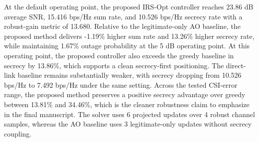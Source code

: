 At the default operating point, the proposed IRS-Opt controller reaches 23.86 dB average SNR, 15.416 bps/Hz sum rate, and 10.526 bps/Hz secrecy rate with a robust-gain metric of 13.680. Relative to the legitimate-only AO baseline, the proposed method delivers -1.19\% higher sum rate and 13.26\% higher secrecy rate, while maintaining 1.67\% outage probability at the 5 dB operating point. At this operating point, the proposed controller also exceeds the greedy baseline in secrecy by 13.86\%, which supports a clean secrecy-first positioning. The direct-link baseline remains substantially weaker, with secrecy dropping from 10.526 bps/Hz to 7.492 bps/Hz under the same setting. Across the tested CSI-error range, the proposed method preserves a positive secrecy advantage over greedy between 13.81\% and 34.46\%, which is the cleaner robustness claim to emphasize in the final manuscript. The solver uses 6 projected updates over 4 robust channel samples, whereas the AO baseline uses 3 legitimate-only updates without secrecy coupling.
